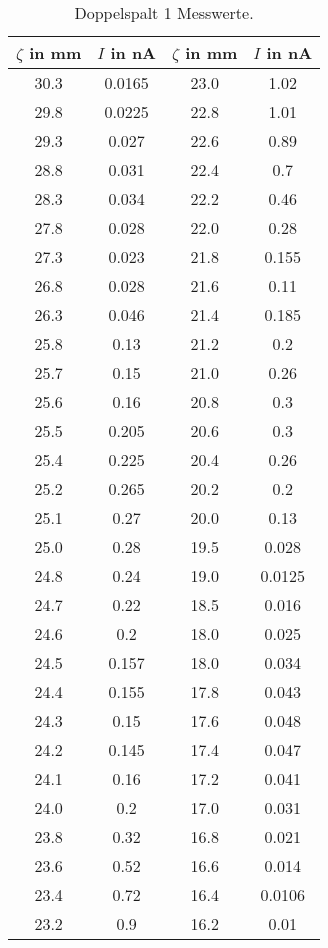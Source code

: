 \begin{table}
  \centering
  \caption{Doppelspalt 1 Messwerte.}
  \label{tab:doppel1}
\begin{tabular}{c c | c c}
  \toprule
  $\zeta$ in mm & $I$ in nA & $\zeta$ in mm & $I$ in nA \\
  \midrule
  30.3  &  0.0165  &  23.0  &  1.02 \\
  29.8  &  0.0225  &  22.8  &  1.01 \\
  29.3  &  0.027  &  22.6  &  0.89 \\
  28.8  &  0.031  &  22.4  &  0.7 \\
  28.3  &  0.034  &  22.2  &  0.46 \\
  27.8  &  0.028  &  22.0  &  0.28 \\
  27.3  &  0.023  &  21.8  &  0.155 \\
  26.8  &  0.028  &  21.6  &  0.11 \\
  26.3  &  0.046  &  21.4  &  0.185 \\
  25.8  &  0.13  &  21.2  &  0.2 \\
  25.7  &  0.15  &  21.0  &  0.26 \\
  25.6  &  0.16  &  20.8  &  0.3 \\
  25.5  &  0.205  &  20.6  &  0.3 \\
  25.4  &  0.225  &  20.4  &  0.26 \\
  25.2  &  0.265  &  20.2  &  0.2 \\
  25.1  &  0.27  &  20.0  &  0.13 \\
  25.0  &  0.28  &  19.5  &  0.028 \\
  24.8  &  0.24  &  19.0  &  0.0125 \\
  24.7  &  0.22  &  18.5  &  0.016 \\
  24.6  &  0.2  &  18.0  &  0.025 \\
  24.5  &  0.157  &  18.0  &  0.034 \\
  24.4  &  0.155  &  17.8  &  0.043 \\
  24.3  &  0.15  &  17.6  &  0.048 \\
  24.2  &  0.145  &  17.4  &  0.047 \\
  24.1  &  0.16  &  17.2  &  0.041 \\
  24.0  &  0.2  &  17.0  &  0.031 \\
  23.8  &  0.32  &  16.8  &  0.021 \\
  23.6  &  0.52  &  16.6  &  0.014 \\
  23.4  &  0.72  &  16.4  &  0.0106 \\
  23.2  &  0.9  &  16.2  &  0.01 \\
  \bottomrule
\end{tabular}
\end{table}
\FloatBarrier

